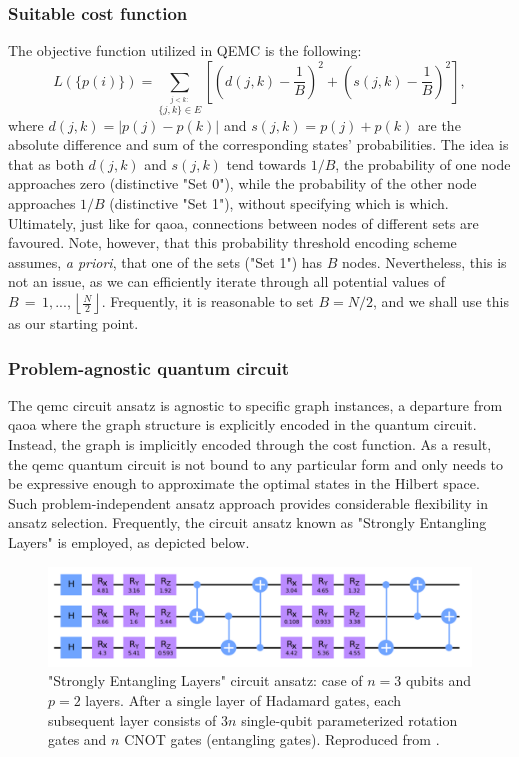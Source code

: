 \subsubsection*{\small Suitable cost function}
The objective function utilized in QEMC is the following:
\begin{equation}
L(\{p(i)\}) = \sum_{\stackrel{j < k:}{\{j,k\}\in E}}\left[\left(d(j,k)-\frac{1}{B}\right)^{2}+\left(s(j,k)-\frac{1}{B}\right)^{2}\right],
\end{equation}
where $d(j,k) = |p(j) - p(k)|$ and $s(j, k) = p(j) + p(k)$ are the absolute difference and sum of the corresponding states' probabilities. The idea is that as both $d(j, k)$ and $s(j, k)$ tend towards $1/B$, the probability of one node approaches zero (distinctive "Set 0"), while the probability of the other node approaches $1/B$ (distinctive "Set 1"), without specifying which is which. Ultimately, just like for \acrshort{qaoa}, connections between nodes of different sets are favoured. Note, however, that this probability threshold encoding scheme assumes, \textit{a priori}, that one of the sets ("Set 1") has $B$ nodes. Nevertheless, this is not an issue, as we can efficiently iterate through all potential values of $B\,=\,1,...,\left\lfloor{\frac{N}{2}}\right\rfloor$. Frequently, it is reasonable to set $B = N/2$, and we shall use this as our starting point.

\subsubsection*{\small Problem-agnostic quantum circuit}
The \acrshort{qemc} circuit ansatz is agnostic to specific graph instances, a departure from \acrshort{qaoa} where the graph structure is explicitly encoded in the quantum circuit. Instead, the graph is implicitly encoded through the cost function. As a result, the \acrshort{qemc} quantum circuit is not bound to any particular form and only needs to be expressive enough to approximate the optimal states in the Hilbert space. Such problem-independent ansatz approach provides considerable flexibility in ansatz selection. Frequently, the circuit ansatz known as "Strongly Entangling Layers" is employed, as depicted below. %

\begin{figure}[H]
    \centering
    \includegraphics[width = 0.85\linewidth]{Figures/Diagrams/Strongly_Entangling_Layers.png}
    \caption{"Strongly Entangling Layers" circuit ansatz: case of $n = 3$ qubits and $p = 2$ layers. After a single layer of Hadamard gates, each subsequent layer consists of $3n$ single-qubit parameterized rotation gates and $n$ CNOT gates (entangling gates). Reproduced from \cite{tenecohen2023variational}.}
    \label{fig:Strongly_Entangling_Layers}
\end{figure}

